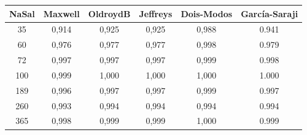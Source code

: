 
	\begin{table}[h]
		{%
			\begin{tabular}{c |c c c c c}
				\toprule
                 NaSal  & Maxwell & OldroydB & Jeffreys & Dois-Modos & García-Saraji \\ \midrule
				35  & 0,914   & 0,925    & 0,925    & 0,988  & 0.941    \\
				60  & 0,976   & 0,977    & 0,977    & 0,998  & 0.979    \\
				72  & 0,997   & 0,997    & 0,997    & 0,999  & 0.998    \\
				100 & 0,999   & 1,000    & 1,000    & 1,000  & 1.000    \\
				189 & 0,996   & 0,997    & 0,997    & 0,999  & 0.997    \\
				260 & 0,993   & 0,994    & 0,994    & 0,994  & 0.994    \\
				365 & 0,998   & 0,999    & 0,999    & 1,000  & 0.999    \\ \bottomrule
			\end{tabular}
		}{}
	\end{table}  

